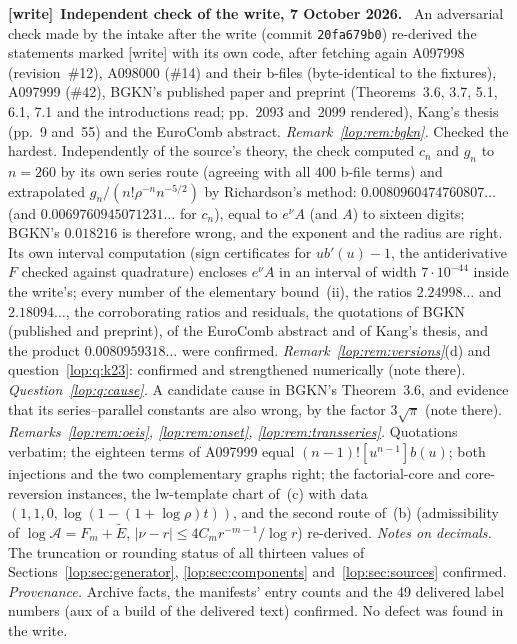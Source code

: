 \documentclass[11pt,letterpaper]{article}
\numberwithin{equation}{section}
\theoremstyle{remark}\newtheorem{remark}[theorem]{Remark}
\newcommand{\file}[1]{\nolinkurl{#1}}
\newenvironment{writenote}[1][]{\par\smallskip\begingroup\small
 \noindent\textbf{[write]}\if\relax\detokenize{#1}\relax\else~\textbf{#1.}\fi\ }%
 {\par\endgroup\smallskip}
\begin{document}
\begin{writenote}[Independent check of the write, 7 October 2026]
An adversarial check made by the intake after the write (commit
\file{20fa679b0}) re-derived the statements marked [write] with its own
code, after fetching again A097998 (revision~\#12), A098000 (\#14) and
their b-files (byte-identical to the fixtures), A097999 (\#42), BGKN's
published paper and preprint (Theorems~3.6, 3.7, 5.1, 6.1, 7.1 and the
introductions read; pp.~2093 and~2099 rendered), Kang's thesis (pp.~9
and~55) and the EuroComb abstract. \emph{Remark~\ref{lop:rem:bgkn}.} Checked
the hardest. Independently of the source's theory, the check computed
$c_n$ and $g_n$ to $n=260$ by its own series route (agreeing with all
$400$ b-file terms) and extrapolated $g_n/(n!\rho^{-n}n^{-5/2})$ by
Richardson's method: $0.0080960474760807\ldots$ (and
$0.0069760945071231\ldots$ for $c_n$), equal to $e^\nu A$ (and $A$) to
sixteen digits; BGKN's $0.018216$ is therefore wrong, and the exponent and
the radius are right. Its own interval computation (sign certificates for
$ub'(u)-1$, the antiderivative $F$ checked against quadrature) encloses
$e^\nu A$ in an interval of width $7\cdot10^{-44}$ inside the write's; every
number of the elementary bound~(ii), the ratios $2.24998\ldots$ and
$2.18094\ldots$, the corroborating ratios and residuals, the quotations of
BGKN (published and preprint), of the EuroComb abstract and of Kang's thesis,
and the product $0.0080959318\ldots$ were confirmed.
\emph{Remark~\ref{lop:rem:versions}}(d) and question~\ref{lop:q:k23}:
confirmed and strengthened numerically (note there). \emph{Question~\ref{lop:q:cause}.}
A candidate cause in BGKN's Theorem~3.6, and evidence that its
series--parallel constants are also wrong, by the factor $3\sqrt\pi$ (note
there). \emph{Remarks~\ref{lop:rem:oeis}, \ref{lop:rem:onset},
\ref{lop:rem:transseries}.} Quotations verbatim; the eighteen terms of
A097999 equal $(n-1)![u^{n-1}]b(u)$; both injections and the two
complementary graphs right; the factorial-core and core-reversion
instances, the $\mathrm{lw}$-template chart of~(c) with data
$(1,1,0,\log(1-(1+\log\rho)t))$, and the second route of~(b) (admissibility of
$\log\mathcal A=F_m+\tilde E$, $|\nu-r|\le4C_mr^{-m-1}/\log r$) re-derived.
\emph{Notes on decimals.} The truncation or rounding status of all thirteen
values of Sections~\ref{lop:sec:generator}, \ref{lop:sec:components}
and~\ref{lop:sec:sources} confirmed. \emph{Provenance.} Archive facts, the
manifests' entry counts and the 49 delivered label numbers (aux of a build
of the delivered text) confirmed. No defect was found in the write.
\end{writenote}
\end{document}
